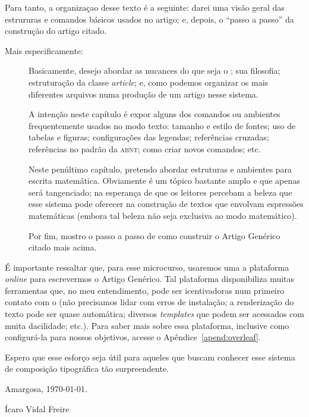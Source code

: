 Para tanto, a organizaçao desse texto é a seguinte: darei uma visão geral das 
estrururas e comandos básicos usados no artigo; e, depois, o ``passo a passo''
da construção do artigo citado. 

Mais especificamente:

\begin{description}
  \item[] 
       Basicamente, desejo abordar as nucances do que seja o ; 
       sua filosofia; estruturação da classe \textit{article}; e, como podemos 
       organizar os mais diferentes arquivos numa produção de um artigo nesse 
       sistema. 
  \item[] 
       A intenção neste capítulo é expor alguns dos comandos ou ambientes 
       frequentemente usados no \textsf{modo texto}: tamanho e estilo de fontes;
       uso de tabelas e figuras; configurações das legendas; referências cruzadas; 
       referências no padrão da \textsc{abnt}; como criar novos comandos; etc. 
  \item[] 
       Neste penúltimo capítulo, pretendo abordar estruturas e ambientes para 
       escrita matemática. 
       Obviamente é um tópico bastante amplo e que apenas será tangenciado;
       na esperança de que os leitores percebam a beleza que esse sistema pode 
       oferecer na construção de textos que envolvam espressões matemáticas 
       (embora tal beleza não seja exclusiva ao modo matemático).
  \item[] 
       Por fim, mostro o passo a passo de como construir o \textsf{Artigo Genérico}
       citado mais acima. 
\end{description}

É importante ressaltar que, para esse microcurso, usaremos uma a plataforma 
\textit{online}  para escrevermos o 
\textsf{Artigo Genérico}. 
Tal plataforma disponibiliza muitas ferramentas que, no meu entendimento, pode 
ser icentivadoras num primeiro contato com o  (não precisamos 
lidar com erros de instalação; a renderização do texto pode ser quase automática; 
diversos \textit{templates} que podem ser acessados com muita dacilidade; etc.). 
Para saber mais sobre essa plataforma, inclusive como configurá-la para nossos 
objetivos, acesse o Apêndice~\ref{apend:overleaf}.

Espero que esse esforço seja útil para aqueles que buscam conhecer esse 
sistema de composição tipográfica tão surpreendente. 

\begin{flushright}
  Amargosa, \today. 

  \caligrafica \LARGE
  Ícaro Vidal Freire
\end{flushright}




